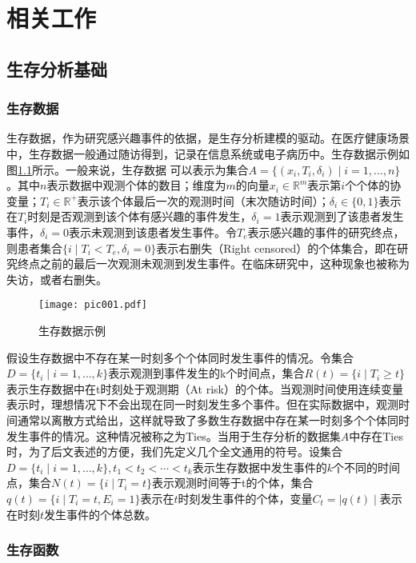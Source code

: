 \chapter{相关工作}

\section{生存分析基础}

\subsection{生存数据}

生存数据，作为研究感兴趣事件的依据，是生存分析建模的驱动。在医疗健康场景中，生存数据一般通过随访得到，记录在信息系统或电子病历中。生存数据示例如图\ref{pic001}所示。一般来说，生存数据 可以表示为集合$A=\{(x_i,T_i,\delta_i ) \mid i=1,\dots,n\}$。其中$n$表示数据中观测个体的数目；维度为$m$的向量$x_i\in \mathbb{R}^m$表示第$i$个个体的协变量；$T_i\in \mathbb{R}^+$表示该个体最后一次的观测时间（末次随访时间）；$\delta_i\in \{0,1\}$表示在$T_i$时刻是否观测到该个体有感兴趣的事件发生，$\delta_i=1$表示观测到了该患者发生事件，$\delta_i=0$表示未观测到该患者发生事件。令$T_e$表示感兴趣的事件的研究终点，则患者集合$\{i \mid T_i<T_e,\delta_i=0\}$表示右删失（Right censored）的个体集合，即在研究终点之前的最后一次观测未观测到发生事件。在临床研究中，这种现象也被称为失访，或者右删失。

\begin{figure}[h]
\texttt{[image: pic001.pdf]}
\caption{生存数据示例}
\label{pic001}
\end{figure}

假设生存数据中不存在某一时刻多个个体同时发生事件的情况。令集合$D=\{t_i \mid i=1,\dots,k\}$表示观测到事件发生的k个时间点，集合$R(t)=\{i \mid T_i\ge t\}$表示生存数据中在t时刻处于观测期（At risk）的个体。当观测时间使用连续变量表示时，理想情况下不会出现在同一时刻发生多个事件。但在实际数据中，观测时间通常以离散方式给出，这样就导致了多数生存数据中存在某一时刻多个个体同时发生事件的情况。这种情况被称之为Ties。当用于生存分析的数据集$A$中存在Ties时，为了后文表述的方便，我们先定义几个全文通用的符号。设集合$D=\{t_i \mid i=1,\dots,k\},t_1<t_2<\cdots<t_k$表示生存数据中发生事件的$k$个不同的时间点，集合$N(t)=\{i \mid T_i=t\}$表示观测时间等于t的个体，集合$q(t)=\{i \mid T_i=t,E_i=1\}$表示在$t$时刻发生事件的个体，变量$C_t=\mid q(t) \mid$表示在时刻$t$发生事件的个体总数。

\subsection{生存函数}


